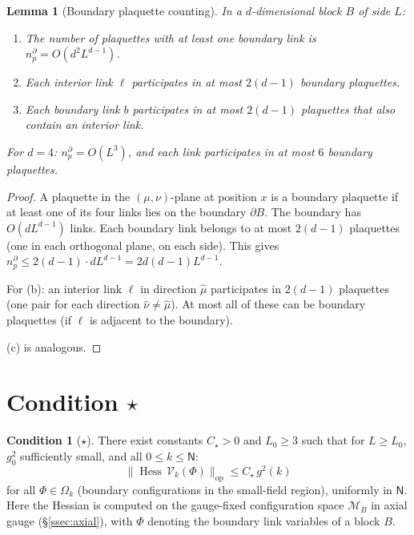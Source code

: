 \documentclass[11pt,a4paper]{article}
\theoremstyle{plain}
\newtheorem{lemma}[theorem]{Lemma}
\theoremstyle{definition}
\newtheorem{condition}[theorem]{Condition}
\theoremstyle{remark}
\newcommand{\Hess}{\operatorname{Hess}}
\newcommand{\cM}{\mathcal{M}}
\newcommand{\cV}{\mathcal{V}}
\begin{document}
\begin{lemma}[Boundary plaquette counting]\label{lem:boundary}
In a $d$-dimensional block $B$ of side $L$:
\begin{enumerate}[label=\textup{(\alph*)},nosep]
  \item The number of plaquettes with at least one boundary
    link is $n_p^{\partial} = O(d^2 L^{d-1})$.
  \item Each interior link $\ell$ participates in at most
    $2(d-1)$ boundary plaquettes.
  \item Each boundary link $b$ participates in at most
    $2(d-1)$ plaquettes that also contain an interior link.
\end{enumerate}
For $d = 4$: $n_p^\partial = O(L^3)$, and each link
participates in at most $6$ boundary plaquettes.
\end{lemma}

\begin{proof}
A plaquette in the $(\mu,\nu)$-plane at position $x$
is a boundary plaquette if at least one of its four links
lies on the boundary $\partial B$. The boundary has
$O(d L^{d-1})$ links. Each boundary link belongs to at
most $2(d-1)$ plaquettes (one in each orthogonal plane,
on each side). This gives $n_p^\partial \le 2(d-1)
\cdot d L^{d-1} = 2d(d-1)L^{d-1}$.

For (b): an interior link $\ell$ in direction $\hat\mu$
participates in $2(d-1)$ plaquettes (one pair for each
direction $\hat\nu \ne \hat\mu$). At most all of these
can be boundary plaquettes (if $\ell$ is adjacent to the
boundary).

(c) is analogous.
\end{proof}

\section{Condition $\star$}\label{sec:condition}

\begin{condition}[$\star$]\label{cond:star}
There exist constants $C_\star > 0$ and $L_0 \ge 3$ such
that for $L \ge L_0$, $g_0^2$ sufficiently small, and
all $0 \le k \le \mathsf{N}$:
\begin{equation}\label{eq:star}
  \boxed{\;\|\Hess\,\cV_k(\Phi)\|_{\mathrm{op}}
  \le C_\star\, g^2(k)\;}
\end{equation}
for all $\Phi \in \Omega_k$ (boundary configurations in
the small-field region), uniformly in $\mathsf{N}$. Here the Hessian is
computed on the gauge-fixed configuration space $\cM_B$
in axial gauge (\S\ref{ssec:axial}), with $\Phi$ denoting
the boundary link variables of a block $B$.
\end{condition}
\end{document}
